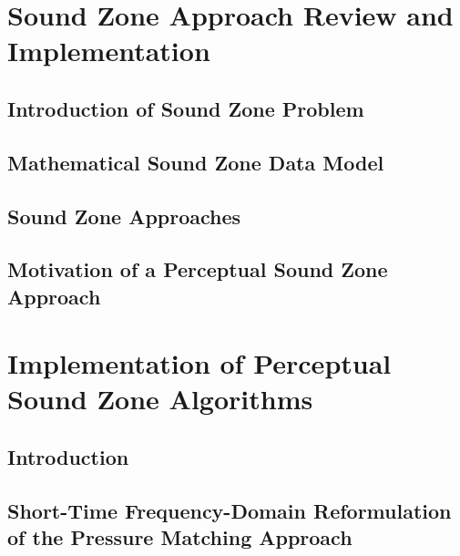 \documentclass[10pt,twoside,openright,titlepage]{ce}
\begin{document}
\chapter{Sound Zone Approach Review and Implementation}
\label{ch:sound_zone}
% 
\section{Introduction of Sound Zone Problem}
\label{ch:sound_zone:problem}

\newpage
\section{Mathematical Sound Zone Data Model}
\label{ch:sound_zone:data_model}

\newpage
\section{Sound Zone Approaches}
\label{ch:sound_zone:approaches}

\newpage
\section{Motivation of a Perceptual Sound Zone Approach}
\label{ch:sound_zone:approach_selection}

\newpage
% 

\chapter{Implementation of Perceptual Sound Zone Algorithms}
\label{ch:perceptual_sound_zone}
\section{Introduction}
\label{ch:perceptual_sound_zone:introduction}

\newpage
\section{Short-Time Frequency-Domain Reformulation of the Pressure Matching Approach}
\label{ch:perceptual_sound_zone:block_based}

\newpage
% 
\end{document}
